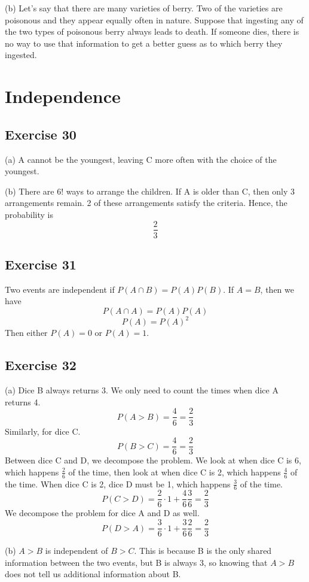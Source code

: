 \documentclass{book}
\begin{document}
\noindent
(b) Let's say that there are many varieties of berry. Two of the varieties are poisonous and they appear equally often in nature. Suppose that ingesting any of the two types of poisonous berry always leads to death. If someone dies, there is no way to use that information to get a better guess as to which berry they ingested.

\section{Independence}

\subsection*{Exercise 30}
(a) A cannot be the youngest, leaving C more often with the choice of the youngest.

\noindent
(b) There are $6!$ ways to arrange the children. If A is older than C, then only 3 arrangements remain. 2 of these arrangements satisfy the criteria. Hence, the probability is
$$\frac{2}{3}$$

\subsection*{Exercise 31}
Two events are independent if $P(A \cap B) = P(A)P(B)$. If $A = B$, then we have
$$P(A \cap A) = P(A)P(A)$$
$$P(A) = P(A)^2$$
Then either $P(A) = 0$ or $P(A) = 1$.

\subsection*{Exercise 32}
(a)
Dice B always returns 3. We only need to count the times when dice A returns 4.
$$P(A > B) = \frac{4}{6} = \frac{2}{3}$$
Similarly, for dice C.
$$P(B > C) = \frac{4}{6} = \frac{2}{3}$$
Between dice C and D, we decompose the problem. We look at when dice C is 6, which happens $\frac{2}{6}$ of the time, then look at when dice C is 2, which happens $\frac{4}{6}$ of the time. When dice C is 2, dice D must be 1, which happens $\frac{3}{6}$ of the time.
$$P(C > D) = \frac{2}{6} \cdot 1 + \frac{4}{6} \frac{3}{6} = \frac{2}{3}$$
We decompose the problem for dice A and D as well.
$$P(D > A) = \frac{3}{6} \cdot 1 + \frac{3}{6} \frac{2}{6} = \frac{2}{3}$$

\noindent
(b) $A > B$ is independent of $B > C$. This is because B is the only shared information between the two events, but B is always 3, so knowing that $A > B$ does not tell us additional information about B.
\end{document}
